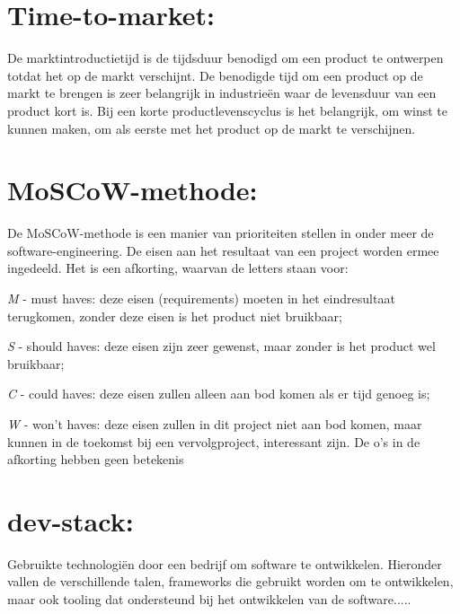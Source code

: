 \section{Time-to-market:}\label{sec:time-to-market:}
De marktintroductietijd is de tijdsduur benodigd om een product te ontwerpen totdat het op de markt verschijnt.
De benodigde tijd om een product op de markt te brengen is zeer belangrijk in industrieën waar de levensduur van een product kort is.
Bij een korte productlevenscyclus is het belangrijk, om winst te kunnen maken, om als eerste met het product op de markt te verschijnen.
\smallskip

\section{MoSCoW-methode:}\label{sec:moscow-methode:}
De MoSCoW-methode is een manier van prioriteiten stellen in onder meer de software-engineering.
De eisen aan het resultaat van een project worden ermee ingedeeld.
Het is een afkorting, waarvan de letters staan voor:

\textit{M} - must haves: deze eisen (requirements) moeten in het eindresultaat terugkomen, zonder deze eisen is het product niet bruikbaar;

\textit{S} - should haves: deze eisen zijn zeer gewenst, maar zonder is het product wel bruikbaar;

\textit{C} - could haves: deze eisen zullen alleen aan bod komen als er tijd genoeg is;

\textit{W} - won't haves: deze eisen zullen in dit project niet aan bod komen, maar kunnen in de toekomst bij een vervolgproject, interessant zijn.
De o's in de afkorting hebben geen betekenis
\smallskip

\section{dev-stack:}\label{sec:dev-stack:2}
Gebruikte technologiën door een bedrijf om software te ontwikkelen.
Hieronder vallen de verschillende talen, frameworks die gebruikt worden om te ontwikkelen, maar ook tooling dat ondersteund bij het ontwikkelen van de software.....
